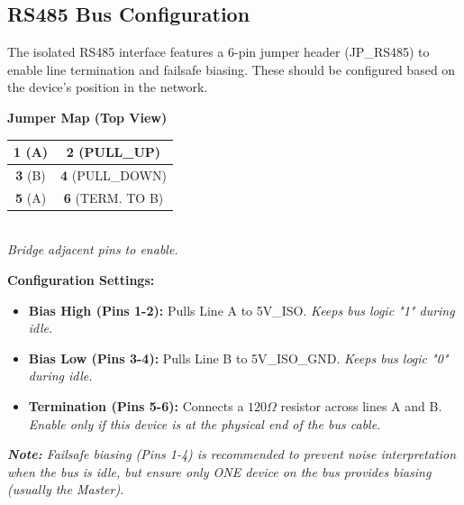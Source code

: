 \documentclass[10pt]{datasheet}
\begin{document}
\subsection{RS485 Bus Configuration}
The isolated RS485 interface features a 6-pin jumper header (JP\_RS485) to enable line termination and failsafe biasing. These should be configured based on the device's position in the network.

\vspace{0.5em}

\noindent
\begin{minipage}{0.35\textwidth}
    \centering
    \textbf{Jumper Map (Top View)} \\
    \vspace{0.5em}
    \begin{tabular}{|c|c|}
        \hline
        \footnotesize \textbf{1} (A) & \footnotesize \textbf{2} (PULL\_UP) \\
        \hline
        \footnotesize \textbf{3} (B) & \footnotesize \textbf{4} (PULL\_DOWN) \\
        \hline
        \footnotesize \textbf{5} (A) & \footnotesize \textbf{6} (TERM. TO B) \\
        \hline
    \end{tabular}
    \\ \vspace{0.5em}
    \footnotesize \textit{Bridge adjacent pins to enable.}
\end{minipage}%
\hfill
\begin{minipage}{0.6\textwidth}
    \textbf{Configuration Settings:}
    \begin{itemize}[noitemsep, leftmargin=1.5em, topsep=0pt]
        \item \textbf{Bias High (Pins 1-2):} Pulls Line A to 5V\_ISO. \textit{Keeps bus logic "1" during idle.}
        \item \textbf{Bias Low (Pins 3-4):} Pulls Line B to 5V\_ISO\_GND. \textit{Keeps bus logic "0" during idle.}
        \item \textbf{Termination (Pins 5-6):} Connects a $120\Omega$ resistor across lines A and B. \textit{Enable only if this device is at the physical end of the bus cable.}
    \end{itemize}
\end{minipage}

\vspace{0.5em}
\noindent \textit{\footnotesize \textbf{Note:} Failsafe biasing (Pins 1-4) is recommended to prevent noise interpretation when the bus is idle, but ensure only ONE device on the bus provides biasing (usually the Master).}
\end{document}
